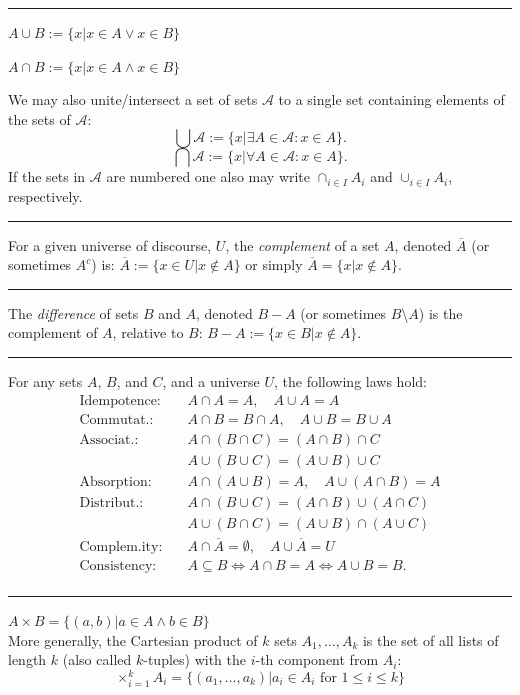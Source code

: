 \documentclass[a4paper]{extarticle}
\newcommand{\cA}{\mathcal{A}}
\newcommand{\sep}{\vspace{5pt}\noindent\hrule\vspace{5pt}}
\begin{document}
\begin{multicols*}{2}
\sep

\Def[Union] $A\cup B:=\{x|x\in A \lor x\in B\}$

\Def[Intersection] $A\cap B:=\{x|x\in A \land x\in B\}$

\Def We may also unite/intersect a set of sets $\cA$ to a single set containing
elements of the sets of $\cA$:
\[
\bigcup\cA := \{x| \exists A\in\cA : x\in A\}. 
\]
\[
\bigcap \cA := \{x| \forall A \in \cA : x \in A\}.
\]
If the sets in $\cA$ are numbered one also may write $\cap_{i\in I}A_i$ and
$\cup_{i\in I}A_i$, respectively.

\sep

\Def[Complement] For a given universe of discourse, $U$, the \emph{complement}
of a set $A$, denoted $\overline{A}$ (or sometimes $A^{c}$) is:
$\overline{A}:=\{x\in U| x\notin A\}$ or simply $\overline{A}=\{x|x\notin A\}$.

\sep

\Def[Difference] The \emph{difference} of sets $B$ and $A$, denoted $B-A$ (or
sometimes $B$\textbackslash$A$) is the complement of $A$, relative to $B$: $B-A
:= \{x\in B|x\notin A\}$.

\sep

 For any sets $A$, $B$, and $C$, and a universe
$U$, the following laws hold:
\begin{align*}
\text{Idempotence:} \quad 		& A \cap A = A, \quad  A \cup A = A \\
\text{Commutat.:} \quad    & A \cap B = B \cap A, \quad A \cup B = B \cup
A\\
\text{Associat.:} \quad 	& A \cap (B \cap C) = (A \cap B) \cap C\\
								& A \cup (B \cup C) = (A \cup B) \cup C\\
\text{Absorption:} \quad		& A \cap (A \cup B) = A, \quad A \cup (A \cap B) =
A\\
\text{Distribut.:} \quad   & A \cap (B \cup C) = (A\cap B) \cup (A \cap
C)\\
 								& A \cup (B \cap C) = (A\cup B) \cap (A \cup C)\\
\text{Complem.ity:} \quad  & A \cap \overline{A} = \emptyset, \quad A \cup
\overline{A} = U\\
\text{Consistency:} \quad      & A \subseteq B \Leftrightarrow A\cap B =
A \Leftrightarrow A \cup B = B.\\
\end{align*}

\sep

 $A\times B = \{(a,b)|a\in A\land b \in B\}$
\\
More generally, the Cartesian product of $k$ sets $A_1,\ldots,A_k$ is the set
of all lists of length $k$ (also called $k$-tuples) with the $i$-th component
from $A_i$:
\[
\times_{i=1}^{k}A_i = \{(a_1,\ldots,a_k)|a_i\in A_i \text{ for } 1\leq i
\leq k\}
\]


\end{multicols*}
\end{document}

